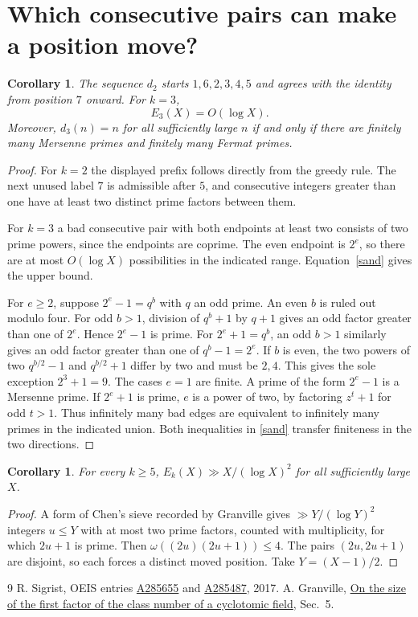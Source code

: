 \documentclass[11pt]{article}
\newtheorem{corollary}[theorem]{Corollary}
\begin{document}
\clearpage
\section{Which consecutive pairs can make a position move?}
\begin{corollary}
The sequence $d_2$ starts $1,6,2,3,4,5$ and agrees with the identity from position $7$ onward. For $k=3$,
\[
 E_3(X)=O(\log X).
\]
Moreover, $d_3(n)=n$ for all sufficiently large $n$ if and only if there are finitely many Mersenne primes and finitely many Fermat primes.
\end{corollary}
\begin{proof}
For $k=2$ the displayed prefix follows directly from the greedy rule. The next unused label $7$ is admissible after $5$, and consecutive integers greater than one have at least two distinct prime factors between them.

For $k=3$ a bad consecutive pair with both endpoints at least two consists of two prime powers, since the endpoints are coprime. The even endpoint is $2^e$, so there are at most $O(\log X)$ possibilities in the indicated range. Equation~\eqref{sand} gives the upper bound.

For $e\ge2$, suppose $2^e-1=q^b$ with $q$ an odd prime. An even $b$ is ruled out modulo four. For odd $b>1$, division of $q^b+1$ by $q+1$ gives an odd factor greater than one of $2^e$. Hence $2^e-1$ is prime. For $2^e+1=q^b$, an odd $b>1$ similarly gives an odd factor greater than one of $q^b-1=2^e$. If $b$ is even, the two powers of two $q^{b/2}-1$ and $q^{b/2}+1$ differ by two and must be $2,4$. This gives the sole exception $2^3+1=9$. The cases $e=1$ are finite. A prime of the form $2^e-1$ is a Mersenne prime. If $2^e+1$ is prime, $e$ is a power of two, by factoring $z^t+1$ for odd $t>1$. Thus infinitely many bad edges are equivalent to infinitely many primes in the indicated union. Both inequalities in \eqref{sand} transfer finiteness in the two directions.
\end{proof}
\begin{corollary}
For every $k\ge5$, $E_k(X)\gg X/(\log X)^2$ for all sufficiently large $X$.
\end{corollary}
\begin{proof}
A form of Chen's sieve recorded by Granville \cite[Sec.~5]{granville} gives $\gg Y/(\log Y)^2$ integers $u\le Y$ with at most two prime factors, counted with multiplicity, for which $2u+1$ is prime. Then $\omega((2u)(2u+1))\le4$. The pairs $(2u,2u+1)$ are disjoint, so each forces a distinct moved position. Take $Y=(X-1)/2$.
\end{proof}
\begin{thebibliography}{9}\small
{} R. Sigrist, OEIS entries \href{https://oeis.org/A285655}{A285655} and \href{https://oeis.org/A285487}{A285487}, 2017.
 A. Granville, \href{https://dms.umontreal.ca/~andrew/PDF/Kummer.pdf}{On the size of the first factor of the class number of a cyclotomic field}, Sec.~5.
\end{thebibliography}
\end{document}
